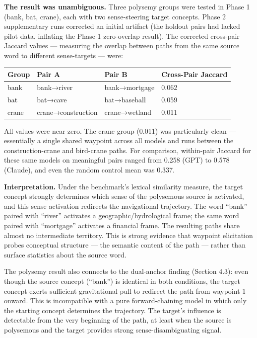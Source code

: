 \textbf{The result was unambiguous.} Three polysemy groups were tested in Phase 1 (bank, bat, crane), each with two sense-steering target concepts. Phase 2 supplementary runs corrected an initial artifact (the holdout pairs had lacked pilot data, inflating the Phase 1 zero-overlap result). The corrected cross-pair Jaccard values --- measuring the overlap between paths from the same source word to different sense-targets --- were:

\begin{longtable}[]{@{}llll@{}}
\toprule\noalign{}
Group & Pair A & Pair B & Cross-Pair Jaccard \\
\midrule\noalign{}
\endhead
\bottomrule\noalign{}
\endlastfoot
bank & bank→river & bank→mortgage & 0.062 \\
bat & bat→cave & bat→baseball & 0.059 \\
crane & crane→construction & crane→wetland & 0.011 \\
\end{longtable}

All values were near zero. The crane group (0.011) was particularly clean --- essentially a single shared waypoint across all models and runs between the construction-crane and bird-crane paths. For comparison, within-pair Jaccard for these same models on meaningful pairs ranged from 0.258 (GPT) to 0.578 (Claude), and even the random control mean was 0.337.

\textbf{Interpretation.} Under the benchmark's lexical similarity measure, the target concept strongly determines which sense of the polysemous source is activated, and this sense activation redirects the navigational trajectory. The word ``bank'' paired with ``river'' activates a geographic/hydrological frame; the same word paired with ``mortgage'' activates a financial frame. The resulting paths share almost no intermediate territory. This is strong evidence that waypoint elicitation probes conceptual structure --- the semantic content of the path --- rather than surface statistics about the source word.

The polysemy result also connects to the dual-anchor finding (Section 4.3): even though the source concept (``bank'') is identical in both conditions, the target concept exerts sufficient gravitational pull to redirect the path from waypoint 1 onward. This is incompatible with a pure forward-chaining model in which only the starting concept determines the trajectory. The target's influence is detectable from the very beginning of the path, at least when the source is polysemous and the target provides strong sense-disambiguating signal.

